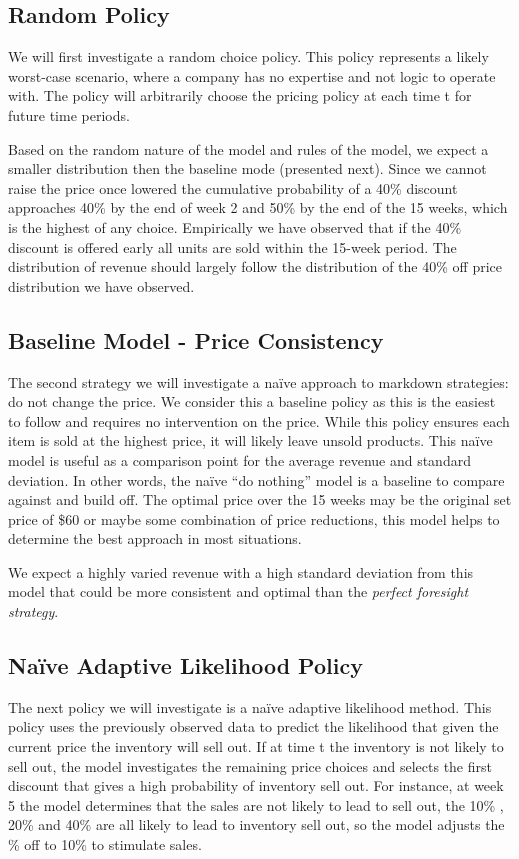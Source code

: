 \documentclass[11pt,a4paper]{article}
\begin{document}
\subsection{Random Policy}
We will first investigate a random choice policy. 
This policy represents a likely worst-case scenario, where a company has no expertise and not logic to operate with. 
The policy will arbitrarily choose the pricing policy at each time t for future time periods.

Based on the random nature of the model and rules of the model, we expect a smaller distribution then the baseline mode (presented next). 
Since we cannot raise the price once lowered the cumulative probability of a 40\% discount approaches 40\% by the end of week 2 and 50\% by the end of the 15 weeks, which is the highest of any choice. 
Empirically we have observed that if the 40\% discount is offered early all units are sold within the 15-week period. 
The distribution of revenue should largely follow the distribution of the 40\% off price distribution we have observed.

\subsection{Baseline Model - Price Consistency}
The second strategy we will investigate a naïve approach to markdown strategies: do not change the price. 
We consider this a baseline policy as this is the easiest to follow and requires no intervention on the price. 
While this policy ensures each item is sold at the highest price, it will likely leave unsold products. 
This naïve model is useful as a comparison point for the average revenue and standard deviation. 
In other words, the naïve “do nothing” model is a baseline to compare against and build off. 
The optimal price over the 15 weeks may be the original set price of \$60 or maybe some combination of price reductions, this model helps to determine the best approach in most situations.

We expect a highly varied revenue with a high standard deviation from this model that could be more consistent and optimal than the \emph{perfect foresight strategy}.

\subsection{Naïve Adaptive Likelihood Policy}
The next policy we will investigate is a naïve adaptive likelihood method. 
This policy uses the previously observed data to predict the likelihood that given the current price the inventory will sell out. 
If at time t the inventory is not likely to sell out, the model investigates the remaining price choices and selects the first discount that gives a high probability of inventory sell out. 
For instance, at week 5 the model determines that the sales are not likely to lead to sell out, the 10\% , 20\% and 40\% are all likely to lead to inventory sell out, so the model adjusts the \% off to 10\% to stimulate sales. 
\end{document}

